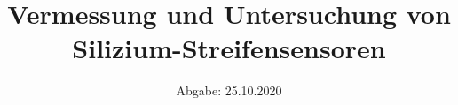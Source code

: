 

\subject{Lehrstuhlversuch im SS2020}
\title{Vermessung und Untersuchung von Silizium-Streifensensoren}
\date{%
  Abgabe: 25.10.2020
}



\maketitle
\thispagestyle{empty}
\tableofcontents
\newpage







%


